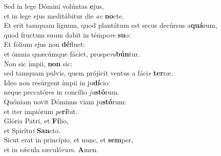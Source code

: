\evenverse Sed in lege Dómini volúntas \textbf{e}jus,~\*\\
\evenverse et in lege ejus meditábitur die \textit{ac} \textbf{no}cte.\\
\oddverse Et erit tamquam lignum, quod plantátum est secus decúrsus a\textbf{quá}rum,~\*\\
\oddverse quod fructum suum dabit in témpo\textit{re} \textbf{su}o:\\
\evenverse Et fólium ejus non \textbf{dé}fluet:~\*\\
\evenverse et ómnia quæcúmque fáciet, prospe\textit{ra}\textbf{bún}tur.\\
\oddverse Non sic ímpii, \textbf{non} sic:~\*\\
\oddverse sed tamquam pulvis, quem prójicit ventus a fáci\textit{e} \textbf{ter}ræ.\\
\evenverse Ideo non resúrgent ímpii in ju\textbf{dí}cio:~\*\\
\evenverse neque peccatóres in concílio \textit{ju}\textbf{stó}rum.\\
\oddverse Quóniam novit Dóminus viam ju\textbf{stó}rum:~\*\\
\oddverse et iter impiórum \textit{pe}\textbf{rí}bit.\\
\evenverse Glória Patri, et \textbf{Fí}lio,~\*\\
\evenverse et Spirítu\textit{i} \textbf{San}cto.\\
\oddverse Sicut erat in princípio, et nunc, et \textbf{sem}per,~\*\\
\oddverse et in sǽcula sæculó\textit{rum}. \textbf{A}men.\\
